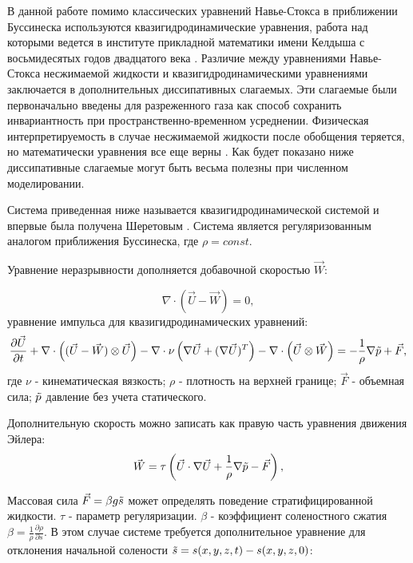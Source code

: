 В данной работе помимо классических уравнений Навье-Стокса в приближении Буссинеска используются квазигидродинамические уравнения, работа над которыми ведется в институте прикладной математики имени Келдыша с восьмидесятых годов двадцатого века \cite{bookELIZ}. Различие между уравнениями Навье-Стокса несжимаемой жидкости и квазигидродинамическими уравнениями заключается в дополнительных диссипативных слагаемых. Эти слагаемые были первоначально введены для разреженного газа как способ сохранить инвариантность при пространственно-временном усреднении\cite{AIAAJ1995}. Физическая интерпретируемость в случае несжимаемой жидкости после обобщения теряется, но математически уравнения все еще верны \cite{Elizarova2011}. Как будет показано ниже диссипативные слагаемые могут быть весьма полезны при численном моделировании. 

Система приведенная ниже называется квазигидродинамической системой и впервые была получена Шеретовым \cite{ElSh2001}. Система является регуляризованным аналогом приближения Буссинеска, где $ \rho = const $.

 
Уравнение неразрывности дополняется добавочной скоростью $\vec{W}$:

    \begin{equation}
      \nabla \cdot \left (\vec U - \vec W \right ) = 0,
      \label{eq:cont}
    \end{equation}
уравнение импульса для квазигидродинамических уравнений:
\begin{equation}
      \frac{\partial \vec U}{\partial t} + \nabla \cdot \left ( (\vec U - \vec W)\otimes \vec U  \right )
      -
      \nabla \cdot \nu \left ( \nabla \vec U + (\nabla \vec U)^T \right ) - \nabla \cdot \left  (   \vec U \otimes \vec W \right )
      = 
      - \frac{1}{\rho} \nabla \Tilde{p} + \vec F,
\end{equation}
где $\nu$ - кинематическая вязкость; $\rho$ - плотность на верхней границе; $ \vec{F}$ - объемная сила; $\Tilde{p}$ давление без учета статического.

Дополнительную скорость можно записать как правую часть уравнения движения Эйлера:
\begin{equation}
      \vec W = \tau \left ( \vec U \cdot \nabla \vec U + \frac{1}{\rho} \nabla \Tilde{p} - \vec F  \right ),
      \label{eq:W}
\end{equation}

Массовая сила $\vec{F} = \beta g \Tilde{s}$ может определять поведение стратифицированной жидкости. $ \tau $ - параметр регуляризации. $ \beta $ - коэффициент соленостного сжатия $ \beta = \frac{1}{\rho}\frac{\partial \rho}{\partial s} $. В этом случае системе требуется дополнительное уравнение для отклонения начальной солености $ \Tilde{s} = s (x, y, z, t) - s (x, y, z, 0) $:

